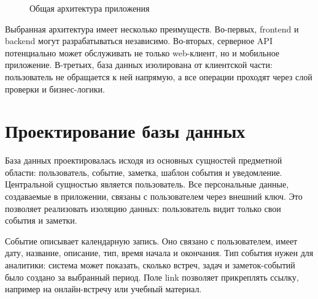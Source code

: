 \documentclass[14pt,a4paper]{extreport}
\begin{document}
\begin{figure}[H]
\centering
{}
\caption{Общая архитектура приложения}
\end{figure}

Выбранная архитектура имеет несколько преимуществ. Во-первых, frontend и backend могут разрабатываться независимо. Во-вторых, серверное API потенциально может обслуживать не только web-клиент, но и мобильное приложение. В-третьих, база данных изолирована от клиентской части: пользователь не обращается к ней напрямую, а все операции проходят через слой проверки и бизнес-логики.

\section{Проектирование базы данных}

База данных проектировалась исходя из основных сущностей предметной области: пользователь, событие, заметка, шаблон события и уведомление. Центральной сущностью является пользователь. Все персональные данные, создаваемые в приложении, связаны с пользователем через внешний ключ. Это позволяет реализовать изоляцию данных: пользователь видит только свои события и заметки.

Событие описывает календарную запись. Оно связано с пользователем, имеет дату, название, описание, тип, время начала и окончания. Тип события нужен для аналитики: система может показать, сколько встреч, задач и заметок-событий было создано за выбранный период. Поле link позволяет прикреплять ссылку, например на онлайн-встречу или учебный материал.
\end{document}
